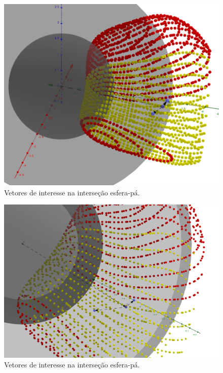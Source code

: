 \begin{figure}[!ht]
	\centering
	\includegraphics[width=\columnwidth]{method/figs/planejamento/vetores_out.png}
	\caption{Vetores de interesse na interseção esfera-pá.}
	\label{fig::vetores_out}
\end{figure}

\begin{figure}[!ht]
	\centering
	\includegraphics[width=\columnwidth]{method/figs/planejamento/vetores_out2.png}
	\caption{Vetores de interesse na interseção esfera-pá.}
	\label{fig::vetores_out2}
\end{figure}


